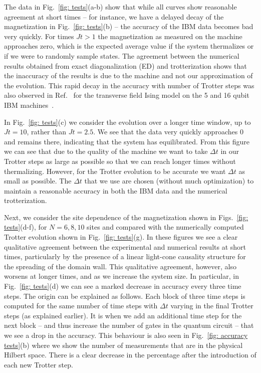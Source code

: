 \documentclass[twocolumn,showpacs,preprintnumbers,nofootinbib,amsmath,aps,pra,longbibliography,amssymb,superscriptaddress]{revtex4-1}
\begin{document}
The data in Fig.~\ref{fig: tests}(a-b) show that while all curves show reasonable agreement at short times -- for instance, we have a delayed decay of the magnetization in Fig.~\ref{fig: tests}(b) -- the accuracy of the IBM data becomes bad very quickly. For times $Jt > 1$ the magnetization as measured on the machine approaches zero, which is the expected average value if the system thermalizes or if we were to randomly sample states. The agreement between the numerical results obtained from exact diagonalization (ED) and trotterization shows that the inaccuracy of the results is due to the machine and not our approximation of the evolution. This rapid decay in the accuracy with number of Trotter steps was also observed in Ref.~\cite{Zhukov2018} for the transverse field Ising model on the 5 and 16 qubit IBM machines~\cite{Leeb2018}.

In Fig.~\ref{fig: tests}(c) we consider the evolution over a longer time window, up to $Jt=10$, rather than $Jt=2.5$. We see that the data very quickly approaches $0$ and remains there, indicating that the system has equilibrated. From this figure we can see that due to the quality of the machine we want to take $\Delta t$ in our Trotter steps as large as possible so that we can reach longer times without thermalizing. However, for the Trotter evolution to be accurate we want $\Delta t$ as small as possible. The $\Delta t$ that we use are chosen (without much optimization) to maintain a reasonable accuracy in both the IBM data and the numerical trotterization.

Next, we consider the site dependence of the magnetization shown in Figs.~\ref{fig: tests}(d-f), for $N=6,8,10$ sites and compared with the numerically computed Trotter evolution shown in Fig.~\ref{fig: tests}(g). In these figures we see a clear qualitative agreement between the experimental and numerical results at short times, particularly by the presence of a linear light-cone causality structure for the spreading of the domain wall. This qualitative agreement, however, also worsens at longer times, and as we increase the system size. In particular, in Fig.~\ref{fig: tests}(d) we can see a marked decrease in accuracy every three time steps. The origin can be explained as follows. Each block of three time steps is computed for the same number of time steps with $\Delta t$ varying in the final Trotter steps (as explained earlier). It is when we add an additional time step for the next block -- and thus increase the number of gates in the quantum circuit -- that we see a drop in the accuracy. This behaviour is also seen in Fig.~\ref{fig: accuracy tests}(b) where we show the number of measurements that are in the physical Hilbert space. There is a clear decrease in the percentage after the introduction of each new Trotter step.
\end{document}

